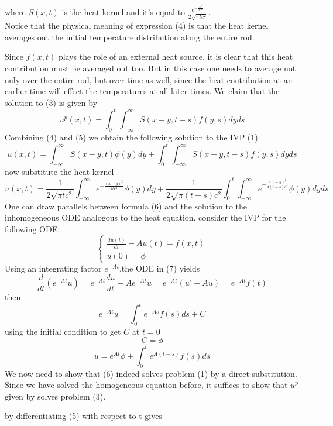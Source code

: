 \documentclass[]{article}
\begin{document}
where $S(x,t)$ is the heat kernel and it's equal to $\displaystyle \frac{e^{-\frac{x^2}{4tc^2}}}{2\sqrt{\pi tc^2}}$.
\\
Notice that the physical meaning of expression (4) is that the heat
kernel averages out the initial temperature distribution along the entire rod.
\par
Since $f(x, t)$ plays the role of an external heat source, it is clear that this heat contribution must be averaged out too. 
But in this case one needs to average not only over the entire rod, but over time as well, 
since the heat contribution at an earlier time will effect the temperatures at all later times. 
We claim that the solution to (3) is given by
\begin{equation}
    u^p(x,t) = \int_{0}^{t}\int_{-\infty}^{\infty}S(x-y,t-s) f(y,s)dyds
\end{equation}
Combining (4) and (5) we obtain the following solution to the IVP (1)
\begin{equation}
    u(x,t)  = \int_{-\infty}^{\infty}S(x-y,t) \phi(y)dy + \int_{0}^{t}\int_{-\infty}^{\infty}S(x-y,t-s) f(y,s)dyds
\end{equation}
now substitute the heat kernel
\[
    u(x,t) = \frac{1}{2\sqrt{\pi tc^2}}\int_{-\infty}^{\infty}e^{-\frac{{(x-y)}^2}{4tc^2}} \phi(y)dy + \frac{1}{2\sqrt{\pi (t-s)c^2}} \int_{0}^{t} \int_{-\infty}^{\infty}e^{-\frac{{(x-y)}^2}{4(t-s)c^2}} \phi(y)dyds            
\]
One can draw parallels between formula (6) and the solution to the inhomogeneous ODE analogous
to the heat equation. consider the IVP for the following ODE.
\begin{equation}
    \begin{cases}
        \displaystyle \frac{du(t)}{dt} - A u(t) = f(x,t)
        \\
        u(0) = \phi
    \end{cases}
\end{equation}
Using an integrating factor $e^{-At}$,the ODE in (7) yields
\[
\frac{d}{dt}\left(e^{-At}u\right)= e^{-At} \frac{du}{dt} - Ae^{-At} u  = e^{-At}(u'-Au) = e^{-At} f(t)
\]
then
\[
    e^{-At}u = \int_{0}^{t} e^{-As} f(s)ds + C
\]
using the initial condition to get $C$ at $t=0$
\[
C = \phi    
\]
\[
    u = e^{At}\phi + \int_{0}^{t} e^{A(t-s)} f(s)ds
\]
We now need to show that (6) indeed solves problem (1) by a direct substitution. 
Since we have solved the homogeneous equation before, it suffices to show that $u^p$ given by solves problem (3). 
\par
by differentiating (5) with respect to t gives
\end{document}
